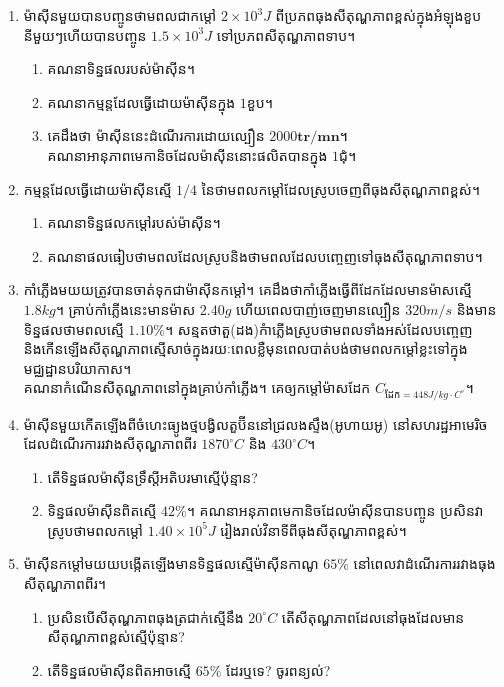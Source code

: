 \begin{enumerate}
	\item ម៉ាសុីនមួយបានបញ្ចូនថាមពលជាកម្តៅ $2\times10^{3}J$ ពីប្រភពធុងសីតុណ្ហភាពខ្ពស់ក្នុងអំឡុងខួបនីមួយៗហើយបានបញ្ចូន $1.5\times10^{3}J$ ទៅប្រភពសីតុណ្ហភាពទាប។
	\begin{enumerate}
		\item គណនាទិន្នផលរបស់ម៉ាសុីន។
		\item គណនាកម្មន្តដែលធ្វើដោយម៉ាសុីនក្នុង $1$ខួប។
		\item គេដឹងថា ម៉ាសុីននេះដំណើរការដោយល្បឿន $2000\mathbf{tr/mn}$។\\
		គណនាអានុភាពមេកានិចដែលម៉ាសុីននោះផលិតបានក្នុង $1$ជុំ។
	\end{enumerate}
	\item កម្មន្តដែលធ្វើដោយម៉ាសុីនស្មើ $1/4$ នៃថាមពលកម្តៅដែលស្រូបចេញពីធុងសីតុណ្ហភាពខ្ពស់។
	\begin{enumerate}
		\item គណនាទិន្នផលកម្តៅរបស់ម៉ាសុីន។
		\item គណនាផលធៀបថាមពលដែលស្រូបនិងថាមពលដែលបញ្ចេញទៅធុងសីតុណ្ហភាពទាប។
	\end{enumerate}
	\item កាំភ្លើងមយយត្រូវបានចាត់ទុកជាម៉ាសុីនកម្តៅ។ គេដឹងថាកាំភ្លើងធ្វើពីដែកដែលមានម៉ាសស្មើ $1.8kg$។ គ្រាប់កាំភ្លើងនេះមានម៉ាស $2.40g$ ហើយពេលបាញ់ចេញមានល្បឿន $320m/s$ និងមានទិន្នផលថាមពលស្មើ $1.10\%$។ សន្មតថាតួ(ដង)កំាភ្លើងស្រូបថាមពលទាំងអស់ដែលបញ្ចេញនិងកើនឡើងសីតុណ្ហភាពស្មើសាច់ក្នុងរយៈពេលខ្លឺមុនពេលបាត់បង់ថាមពលកម្តៅខ្លះទៅក្នុងមជ្ឈដ្ឋានបរិយាកាស។\\ គណនាកំណើនសីតុណ្ហភាពនៅក្នុងគ្រាប់កាំភ្លើង។ គេឲ្យកម្តៅម៉ាសដែក $C_{\text{ដែក}=448J/kg\cdot C^{\circ}}$។
	\item ម៉ាសុីនមួយកើតឡើងពីចំហេះធ្យូងថ្មបង្វិលតួប៊ីននៅជ្រលងស្ទឹង(អូហាយអូ) នៅសហរដ្ឋអាមេរិចដែលដំណើរការរវាងសីតុណ្ហភាពពីរ $1870^\circ C$ និង $430^\circ C$។
	\begin{enumerate}
		\item តើទិន្នផលម៉ាសុីនទ្រឹស្តីអតិបរមាស្មើប៉ុន្មាន?
		\item ទិន្នផលម៉ាសុីនពិតស្មើ $42\%$។ គណនាអនុភាពមេកានិចដែលម៉ាសុីនបានបញ្ចូន ប្រសិនវាស្រូបថាមពលកម្តៅ $1.40\times10^{5}J$ រៀងរាល់វិនាទីពីធុងសីតុណ្ហភាពខ្ពស់។
	\end{enumerate}
	\item ម៉ាសុីនកម្តៅមយយបង្កើតឡើងមានទិន្នផលស្មើម៉ាសុីនកាណូ $65\%$ នៅពេលវាដំណើរការរវាងធុងសីតុណ្ហភាពពីរ។
	\begin{enumerate}
		\item ប្រសិនបើសីតុណ្ហភាពធុងត្រជាក់ស្មើនឹង $20^\circ C$ តើសីតុណ្ហភាពដែលនៅធុងដែលមានសីតុណ្ហភាពខ្ពស់ស្មើប៉ុន្មាន?
		\item តើទិន្នផលម៉ាសុីនពិតអាចស្មើ $65\%$ ដែរឬទេ? ចូរពន្យល់?

\end{enumerate}
\end{enumerate}

